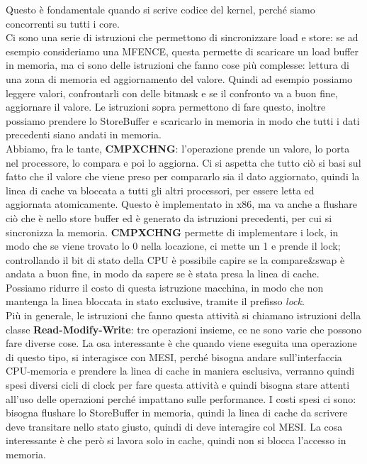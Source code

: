 \documentclass[12pt, oneside]{extbook}
\begin{document}
Questo è fondamentale quando si scrive codice del kernel, perché siamo concorrenti su tutti i core. \\ Ci sono una serie di istruzioni che permettono di sincronizzare load e store: se ad esempio consideriamo una MFENCE, questa permette di scaricare un load buffer in memoria, ma ci sono delle istruzioni che fanno cose più complesse: lettura di una zona di memoria ed aggiornamento del valore. Quindi ad esempio possiamo leggere valori, confrontarli con delle bitmask e se il confronto va a buon fine, aggiornare il valore. Le istruzioni sopra permettono di fare questo, inoltre possiamo prendere lo StoreBuffer e scaricarlo in memoria in modo che tutti i dati precedenti siano andati in memoria. \\ Abbiamo, fra le tante, \textbf{CMPXCHNG}: l'operazione prende un valore, lo porta nel processore, lo compara e poi lo aggiorna. Ci si aspetta che tutto ciò si basi sul fatto che il valore che viene preso per compararlo sia il dato aggiornato, quindi la linea di cache va bloccata a tutti gli altri processori, per essere letta ed aggiornata atomicamente. Questo è implementato in x86, ma va anche a flushare ciò che è nello store buffer ed è generato da istruzioni precedenti, per cui si sincronizza la memoria. \textbf{CMPXCHNG} permette di implementare i lock, in modo che se viene trovato lo 0 nella locazione, ci mette un 1 e prende il lock; controllando il bit di stato della CPU è possibile capire se la compare\&swap è andata a buon fine, in modo da sapere se è stata presa la linea di cache.\\ Possiamo ridurre il costo di questa istruzione macchina, in modo che non mantenga la linea bloccata in stato exclusive, tramite il prefisso \textsf{\textit{lock}}.\\  Più in generale, le istruzioni che fanno questa attività si chiamano istruzioni della classe \textbf{Read-Modify-Write}: tre operazioni insieme, ce ne sono varie che possono fare diverse cose. La osa interessante è che quando viene eseguita una operazione di questo tipo, si interagisce con MESI, perché bisogna andare sull'interfaccia CPU-memoria e prendere la linea di cache in maniera esclusiva, verranno quindi spesi diversi cicli di clock per fare questa attività e quindi bisogna stare attenti all'uso delle operazioni perché impattano sulle performance. I costi spesi ci sono: bisogna flushare lo StoreBuffer in memoria, quindi la linea di cache da scrivere deve transitare nello stato giusto, quindi di deve interagire col MESI. La cosa interessante è che però si lavora solo in cache, quindi non si blocca l'accesso in memoria.
\end{document}
